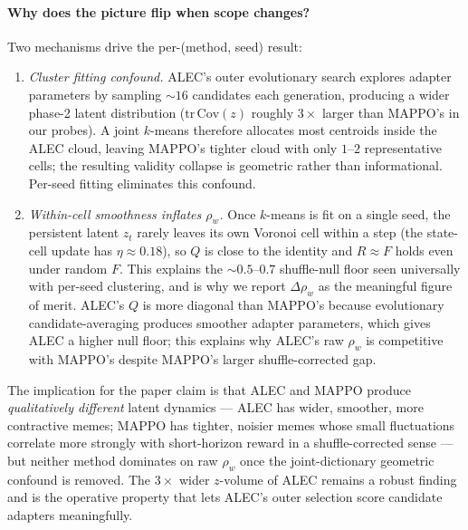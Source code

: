 \paragraph{Why does the picture flip when scope changes?}
Two mechanisms drive the per-(method, seed) result:
\begin{enumerate}\setlength{\itemsep}{1pt}
\item \emph{Cluster fitting confound.} ALEC's outer evolutionary search
explores adapter parameters by sampling ${\sim}\!16$ candidates each
generation, producing a wider phase-2 latent distribution
($\mathrm{tr}\,\mathrm{Cov}(z)$ roughly $3\!\times\!$ larger than MAPPO's
in our probes). A joint $k$-means therefore allocates most centroids
inside the ALEC cloud, leaving MAPPO's tighter cloud with only $1$--$2$
representative cells; the resulting validity collapse is geometric rather
than informational. Per-seed fitting eliminates this confound.
\item \emph{Within-cell smoothness inflates $\rho_w$.} Once $k$-means is
fit on a single seed, the persistent latent $z_t$ rarely leaves its own
Voronoi cell within a step (the state-cell update has $\eta\!\approx\!0.18$),
so $Q$ is close to the identity and $R\!\approx\!F$ holds even under random
$F$. This explains the ${\sim}\!0.5$--$0.7$ shuffle-null floor seen
universally with per-seed clustering, and is why we report
$\Delta\rho_w$ as the meaningful figure of merit. ALEC's $Q$ is more diagonal
than MAPPO's because evolutionary candidate-averaging produces smoother
adapter parameters, which gives ALEC a higher null floor; this explains
why ALEC's raw $\rho_w$ is competitive with MAPPO's despite MAPPO's larger
shuffle-corrected gap.
\end{enumerate}
The implication for the paper claim is that ALEC and MAPPO produce
\emph{qualitatively different} latent dynamics --- ALEC has wider,
smoother, more contractive memes; MAPPO has tighter, noisier memes whose
small fluctuations correlate more strongly with short-horizon reward in a
shuffle-corrected sense --- but neither method dominates on raw $\rho_w$
once the joint-dictionary geometric confound is removed. The
$3\!\times\!$ wider $z$-volume of ALEC remains a robust finding and is
the operative property that lets ALEC's outer selection score candidate
adapters meaningfully.

